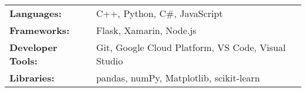 \begin{tabularx}{\linewidth}{@{}l X@{}}
  \textbf{Languages:} & \normalsize{C++, Python, C\#, JavaScript} \\
  \textbf{Frameworks:} &  \normalsize{Flask, Xamarin, Node.js}\\
  \textbf{Developer Tools:}  &  \normalsize{Git, Google Cloud Platform, VS Code, Visual Studio}\\  
  \textbf{Libraries:}  &  \normalsize{pandas, numPy, Matplotlib, scikit-learn}\\  
  \end{tabularx}